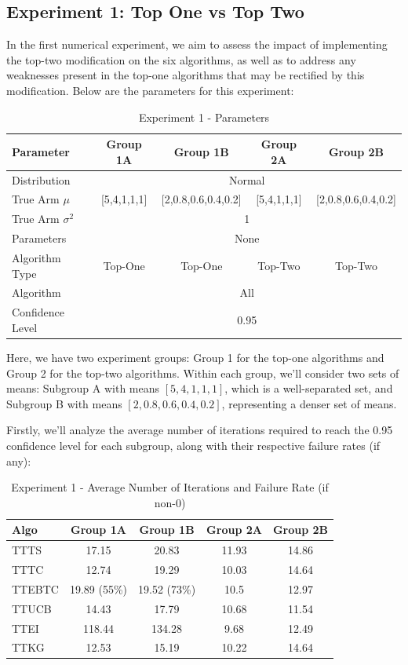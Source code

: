 \documentclass[a4paper, 12pt]{article}
\theoremstyle{definition}
\begin{document}
\subsection{Experiment 1: Top One vs Top Two}
In the first numerical experiment, we aim to assess the impact of implementing the top-two modification on the six algorithms, as well as to address any weaknesses present in the top-one algorithms that may be rectified by this modification. Below are the parameters for this experiment:

\begin{table}[hbt!]
\centering
\begin{tabular}{lcccc}
\hline
Parameter & Group 1A & Group 1B & Group 2A & Group 2B \\
\hline
Distribution & \multicolumn{4}{c}{Normal} \\
True Arm $\mu$ & [5,4,1,1,1] & [2,0.8,0.6,0.4,0.2] & [5,4,1,1,1] & [2,0.8,0.6,0.4,0.2] \\
True Arm $\sigma^2$ & \multicolumn{4}{c}{1} \\
Parameters & \multicolumn{4}{c}{None} \\
Algorithm Type & Top-One & Top-One & Top-Two & Top-Two \\
Algorithm & \multicolumn{4}{c}{All} \\
Confidence Level & \multicolumn{4}{c}{0.95} \\
\hline
\end{tabular}
\caption{Experiment 1 - Parameters}
\label{table:exp1_param}
\end{table}

Here, we have two experiment groups: Group 1 for the top-one algorithms and Group 2 for the top-two algorithms. Within each group, we'll consider two sets of means: Subgroup A with means $[5, 4, 1, 1, 1]$, which is a well-separated set, and Subgroup B with means $[2, 0.8, 0.6, 0.4, 0.2]$, representing a denser set of means.

Firstly, we'll analyze the average number of iterations required to reach the 0.95 confidence level for each subgroup, along with their respective failure rates (if any):

\begin{table}[hbt!]
\centering
\begin{tabular}{lcccc}
\hline
Algo & Group 1A & Group 1B & Group 2A & Group 2B \\
\hline
TTTS & 17.15 & 20.83 & 11.93 & 14.86 \\
TTTC & 12.74 & 19.29 & 10.03 & 14.64 \\
TTEBTC & 19.89 (55\%) & 19.52 (73\%) & 10.5 & 12.97 \\
TTUCB & 14.43 & 17.79 & 10.68 & 11.54 \\
TTEI & 118.44 & 134.28 & 9.68 & 12.49 \\
TTKG & 12.53 & 15.19 & 10.22 & 14.64 \\
\hline
\end{tabular}
\caption{Experiment 1 - Average Number of Iterations and Failure Rate (if non-0)}
\label{table:exp1_iter}
\end{table}
\end{document}
